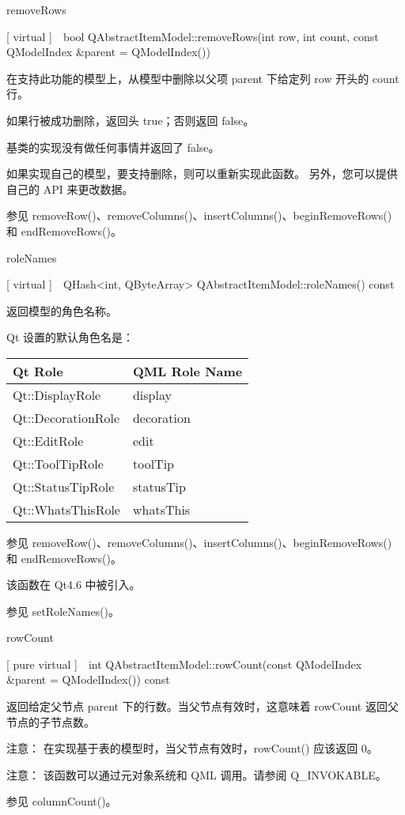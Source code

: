 removeRows

[ virtual ] bool QAbstractItemModel::removeRows(int row, int count, const QModelIndex \&parent = QModelIndex())

在支持此功能的模型上，从模型中删除以父项 parent 下给定列 row 开头的 count 行。

如果行被成功删除，返回头 true；否则返回 false。

基类的实现没有做任何事情并返回了 false。

如果实现自己的模型，要支持删除，则可以重新实现此函数。 另外，您可以提供自己的 API 来更改数据。

参见 removeRow()、removeColumns()、insertColumns()、beginRemoveRows() 和 endRemoveRows()。

roleNames

[ virtual ] QHash<int, QByteArray> QAbstractItemModel::roleNames() const

返回模型的角色名称。

Qt 设置的默认角色名是：

\begin{tabular}{|l|l|}
\hline
Qt Role& QML Role Name \\ 
\hline
Qt::DisplayRole	&display\\
\hline
Qt::DecorationRole&	decoration\\
\hline
Qt::EditRole&	edit\\
\hline
Qt::ToolTipRole	&toolTip\\
\hline
Qt::StatusTipRole&	statusTip\\
\hline
Qt::WhatsThisRole&	whatsThis\\
\hline
\end{tabular}

参见 removeRow()、removeColumns()、insertColumns()、beginRemoveRows() 和 endRemoveRows()。

该函数在 Qt4.6 中被引入。

参见 setRoleNames()。

rowCount

[ pure virtual ] int QAbstractItemModel::rowCount(const QModelIndex \&parent = QModelIndex()) const

返回给定父节点 parent 下的行数。当父节点有效时，这意味着 rowCount 返回父节点的子节点数。

注意： 在实现基于表的模型时，当父节点有效时，rowCount() 应该返回 0。

注意： 该函数可以通过元对象系统和 QML 调用。请参阅 Q\_INVOKABLE。

参见 columnCount()。

